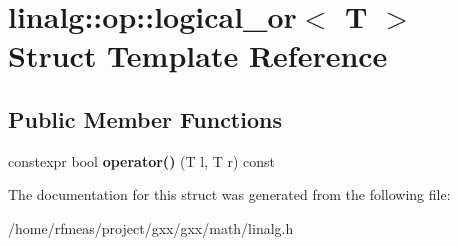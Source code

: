 \hypertarget{structlinalg_1_1op_1_1logical__or}{}\section{linalg\+:\+:op\+:\+:logical\+\_\+or$<$ T $>$ Struct Template Reference}
\label{structlinalg_1_1op_1_1logical__or}
\subsection*{Public Member Functions}
\begin{DoxyCompactItemize}
\item 
constexpr bool {\bfseries operator()} (T l, T r) const \hypertarget{structlinalg_1_1op_1_1logical__or_afbd80af3f194d035068db27ff00bd8b0}{}\label{structlinalg_1_1op_1_1logical__or_afbd80af3f194d035068db27ff00bd8b0}

\end{DoxyCompactItemize}


The documentation for this struct was generated from the following file\+:\begin{DoxyCompactItemize}
\item 
/home/rfmeas/project/gxx/gxx/math/linalg.\+h\end{DoxyCompactItemize}
